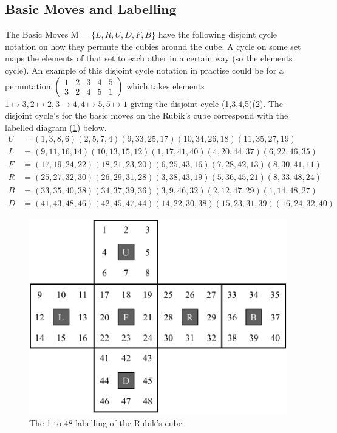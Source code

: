 \documentclass{article}
\newcounter{lem}[section]\setcounter{lem}{0}
\begin{document}
\subsection{Basic Moves and Labelling}
The Basic Moves M = $\{L,R,U,D,F,B\}$ have the following disjoint cycle notation on how they permute the cubies around the cube. A cycle on some set maps the elements of that set to each other in a certain way (so the elements cycle). An example of this disjoint cycle notation in practise could be for a permutation $\begin{pmatrix} 1 &2 &3 &4 &5\\ 3 & 2& 4&5&1\end{pmatrix}$ which takes elements $1 \mapsto 3, 2 \mapsto 2, 3\mapsto 4, 4 \mapsto 5  ,5\mapsto 1$ giving the disjoint cycle  (1,3,4,5)(2). The disjoint cycle's for the basic moves on the Rubik's cube correspond with the labelled diagram (\ref{fig:labelled}) below.
\begin{align*}
U&=( 1, 3, 8, 6)( 2, 5, 7, 4)( 9,33,25,17)(10,34,26,18)(11,35,27,19)\\
L&=( 9,11,16,14)(10,13,15,12)( 1,17,41,40)( 4,20,44,37)( 6,22,46,35)\\
F&=(17,19,24,22)(18,21,23,20)( 6,25,43,16)( 7,28,42,13)( 8,30,41,11)\\
R&=(25,27,32,30)(26,29,31,28)( 3,38,43,19)( 5,36,45,21)( 8,33,48,24)\\
B&=(33,35,40,38)(34,37,39,36)( 3, 9,46,32)( 2,12,47,29)( 1,14,48,27)\\
D&= (41,43,48,46)(42,45,47,44)(14,22,30,38)(15,23,31,39)(16,24,32,40)
\end{align*}

\begin{figure}[hbt]
\includegraphics[scale=.24]{numbercube.png}
\caption{The 1 to 48 labelling of the Rubik's cube}
\label{fig:labelled}
\end{figure}
\end{document}
